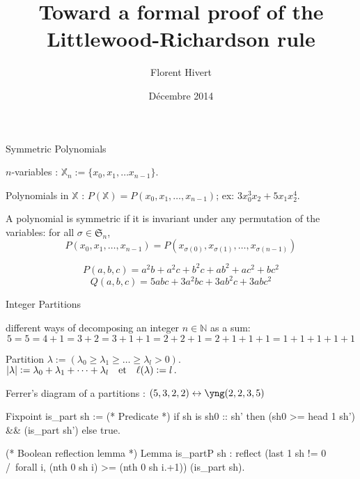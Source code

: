 \documentclass[compress,11pt]{beamer}
\title{\bf\LARGE Toward a formal proof of the \\
Littlewood-Richardson rule}
\subtitle{}
\author{Florent Hivert}
\institute[LRI]{
  LRI / Université Paris Sud 11 / CNRS}
\date[Décembre 2014]{Décembre 2014}
\newcommand{\XX}{{\mathbb X}}
\newcommand{\N}{{\mathbb N}}
\newcommand{\SG}{{\mathfrak S}}
\newcommand{\qandq}{\text{\quad et\quad}}
\renewcommand{\emph}[1]{{\color{red} #1}}
\begin{document}
\frame{\titlepage}

\begin{frame}{Symmetric Polynomials}
  
  $n$-variables : $\XX_n := \{x_0, x_1, \dots x_{n-1}\}$.

  Polynomials in $\XX$ : $P(\XX) = P(x_0, x_1, \dots, x_{n-1})$; ex: $3x_0^3x_2
  + 5 x_1x_2^4$.

  \begin{DEFN}
    A polynomial is \emph{symmetric} if it is invariant under any permutation of the
    variables: for all $\sigma\in\SG_n$,
    \[P(x_0, x_1, \dots, x_{n-1}) = 
    P(x_{\sigma(0)}, x_{\sigma(1)}, \dots, x_{\sigma({n-1})})\]
  \end{DEFN}

  \[P(a,b,c) = a^2b + a^2c + b^2c + ab^2 + ac^2 + bc^2\]
  \[Q(a,b,c) = 5abc + 3a^2bc + 3ab^2c + 3abc^2\]

\end{frame}

\begin{frame}[fragile]{Integer Partitions}

  different ways of decomposing an integer $n\in\N$ as a sum:
  \[ 5=5=4+1=3+2=3+1+1=2+2+1=2+1+1+1=1+1+1+1+1 \]

  Partition $\lambda := (\lambda_0\geq\lambda_1\geq\dots\geq\lambda_l > 0)$.\\
  $|\lambda| := \lambda_0+\lambda_1+\dots+\lambda_l \qandq
  \ell(\lambda) := l\,. $

  Ferrer's diagram of a partitions : $(5,3,2,2) \leftrightarrow \yng(2,2,3,5)$



\begin{coqcode}
  Fixpoint is_part sh := (* Predicate *)
    if sh is sh0 :: sh'
    then (sh0 >= head 1 sh') && (is_part sh')
    else true.

  (* Boolean reflection lemma *)
  Lemma is_partP sh : reflect
    (last 1 sh != 0 /\ forall i, (nth 0 sh i) >= (nth 0 sh i.+1))
    (is_part sh).
\end{coqcode}

\end{frame}

\end{document}
